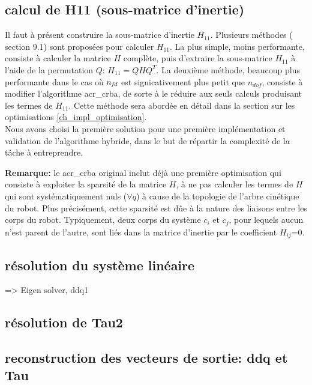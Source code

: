 \documentclass{report}
\begin{document}
\subsection{calcul de H11 (sous-matrice d'inertie)}

Il faut à présent construire la sous-matrice d'inertie $H_{11}$. Plusieurs méthodes (\cite{bib_featherstone} section 9.1) sont proposées pour calculer $H_{11}$. La plus simple, moins performante, consiste à calculer la matrice $H$ complète, puis d'extraire la sous-matrice $H_{11}$ à l'aide de la permutation $Q$: $H_{11}=Q H Q^T$.
La deuxième méthode, beaucoup plus performante dans le cas où $n_{\emph{fd}}$ est signicativement plus petit que $n_{dof}$, consiste à modifier l'algorithme \gls{acr_crba}, de sorte à le réduire aux seuls calculs produisant les termes de $H_{11}$. Cette méthode sera abordée en détail dans la section sur les optimisations \ref{ch_impl_optimisation}.\\
Nous avons choisi la première solution pour une première implémentation et validation de l'algorithme hybride, dans le but de répartir la complexité de la tâche à entreprendre.

\textbf{Remarque:} le \gls{acr_crba} original inclut déjà une première optimisation qui consiste à exploiter la sparsité de la matrice $H$, \cad à ne pas calculer les termes de $H$ qui sont systématiquement nuls ($\forall q$) à cause de la topologie de l'arbre cinétique du robot. Plus précisément, cette sparsité est dûe à la nature des liaisons entre les corps du robot. Typiquement, deux corps du système $c_i$ et $c_j$, pour lequels aucun n'est parent de l'autre, sont liés dans la matrice d'inertie par le coefficient $H_{ij}$=0.

\subsection{résolution du système linéaire}
=> Eigen solver, ddq1

\subsection{résolution de Tau2}

\subsection{reconstruction des vecteurs de sortie: ddq et Tau}
\end{document}
